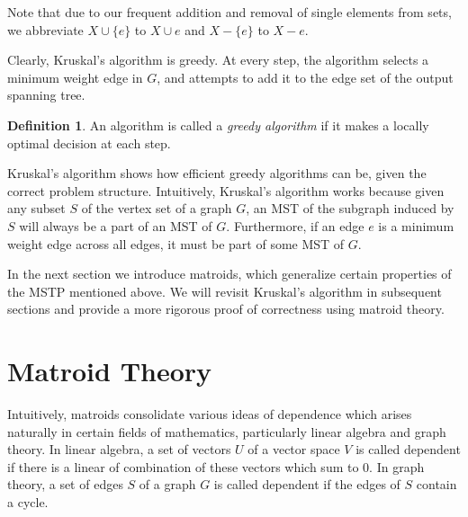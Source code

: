 \documentclass[a4paper,11pt]{report}
\theoremstyle{plain}
\theoremstyle{definition}
\newtheorem{defn}[defn]{Definition}
\begin{document}
Note that due to our frequent addition and removal of single elements from
sets, we abbreviate $X \cup \{e\}$ to $X \cup e$ and $X - \{e\}$ to $X - e$.

Clearly, Kruskal's algorithm is greedy. At every step, the algorithm
selects a minimum weight edge in $G$, and attempts to add it to the edge set
of the output spanning tree.


\begin{defn}
An algorithm is called a \emph{greedy algorithm} if it makes a locally optimal
decision at each step.
\end{defn}

Kruskal's algorithm shows how efficient greedy algorithms can be, given the
correct problem structure. Intuitively, Kruskal's algorithm works because
given any subset $S$ of the vertex set of a graph $G$, an MST of
the subgraph induced by $S$ will always be a part of an MST of $G$.
Furthermore, if an edge $e$ is a minimum weight edge across all edges, it
must be part of some MST of $G$.

In the next section we introduce matroids, which generalize certain properties
of the MSTP mentioned above. We will revisit Kruskal's algorithm in
subsequent sections and provide a more rigorous proof of correctness using
matroid theory.


\section{Matroid Theory}

Intuitively, matroids consolidate various ideas of dependence which
arises naturally in certain fields of mathematics, particularly linear
algebra and graph theory. In linear algebra, a set of vectors $U$ of a
vector space $V$ is called dependent if there is a linear of combination of
these vectors which sum to $0$. In graph theory, a set of edges $S$ of a
graph $G$ is called dependent if the edges of $S$ contain a cycle.
\end{document}
